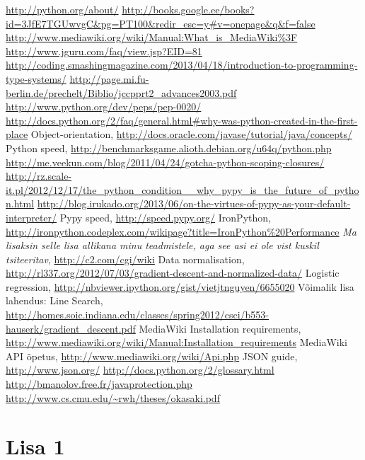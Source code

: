 \documentclass[a4paper, titlepage, 12pt]{article}
\begin{document}
\begin{thebibliography}{99}
\bibitem{}
\url{http://python.org/about/}
\bibitem{}
\url{http://books.google.ee/books?id=3JfE7TGUwvgC&pg=PT100&redir_esc=y#v=onepage&q&f=false}
\bibitem{}
\url{http://www.mediawiki.org/wiki/Manual:What_is_MediaWiki%3F}
\bibitem{}
\url{http://www.jguru.com/faq/view.jsp?EID=81}
\bibitem{}
\url{http://coding.smashingmagazine.com/2013/04/18/introduction-to-programming-type-systems/}
\bibitem{}
\url{http://page.mi.fu-berlin.de/prechelt/Biblio/jccpprt2_advances2003.pdf}
\bibitem{}
\url{http://www.python.org/dev/peps/pep-0020/}
\bibitem{}
\url{http://docs.python.org/2/faq/general.html#why-was-python-created-in-the-first-place}
\bibitem{}
Object-orientation,
\url{http://docs.oracle.com/javase/tutorial/java/concepts/}
\bibitem{}
Python speed,
\url{http://benchmarksgame.alioth.debian.org/u64q/python.php}
\bibitem{}
\url{http://me.veekun.com/blog/2011/04/24/gotcha-python-scoping-closures/}
\bibitem{}
\url{http://rz.scale-it.pl/2012/12/17/the_python_condition__why_pypy_is_the_future_of_python.html}
\bibitem{}
\url{http://blog.irukado.org/2013/06/on-the-virtues-of-pypy-as-your-default-interpreter/}
\bibitem{}
Pypy speed,
\url{http://speed.pypy.org/}
\bibitem{}
IronPython,
\url{http://ironpython.codeplex.com/wikipage?title=IronPython%20Performance}
\bibitem{}
\emph{Ma lisaksin selle lisa allikana minu teadmistele, aga see asi ei ole vist
kuskil tsiteeritav},
\url{http://c2.com/cgi/wiki}
\bibitem{}
Data normalisation,
\url{http://rl337.org/2012/07/03/gradient-descent-and-normalized-data/}
Logistic regression,
\url{http://nbviewer.ipython.org/gist/vietjtnguyen/6655020}
\bibitem{}
Võimalik lisa lahendus: 
Line Search, 
\url{http://homes.soic.indiana.edu/classes/spring2012/csci/b553-hauserk/gradient_descent.pdf}
\bibitem{}
MediaWiki Installation requirements,
\url{http://www.mediawiki.org/wiki/Manual:Installation_requirements}
\bibitem{}
MediaWiki API õpetus,
\url{http://www.mediawiki.org/wiki/Api.php}
\bibitem{}
JSON guide,
\url{http://www.json.org/}
\url{http://docs.python.org/2/glossary.html}
\url{http://bmanolov.free.fr/javaprotection.php}
\url{http://www.cs.cmu.edu/~rwh/theses/okasaki.pdf}
\end{thebibliography}

\section*{Lisa 1}
\end{document}
